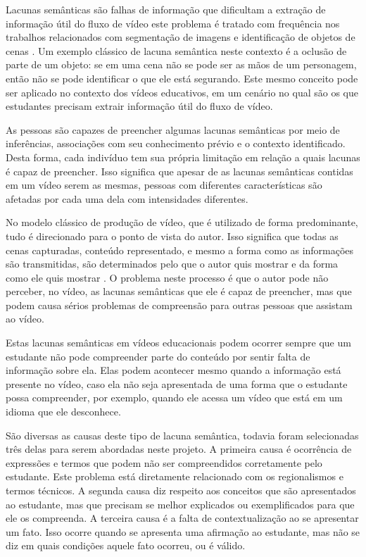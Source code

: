Lacunas semânticas são falhas de informação que dificultam a extração de informação útil do fluxo de vídeo este problema é tratado com frequência nos trabalhos relacionados com segmentação de imagens e identificação de objetos de cenas \cite{895972,SnoekICM2005}. Um exemplo clássico de lacuna semântica neste contexto é a oclusão de parte de um objeto: se em uma cena não se pode ser as mãos de um personagem, então não se pode identificar o que ele está segurando. Este mesmo conceito pode ser aplicado no contexto dos vídeos educativos, em um cenário no qual são os que estudantes precisam extrair informação útil do fluxo de vídeo.

As pessoas são capazes de preencher algumas lacunas semânticas por meio de inferências, associações com seu conhecimento prévio e o contexto identificado. Desta forma, cada indivíduo tem sua própria limitação em relação a quais lacunas é capaz de preencher. Isso significa que apesar de as lacunas semânticas contidas em um vídeo serem as mesmas, pessoas com diferentes características são afetadas por cada uma dela com intensidades diferentes.

No modelo clássico de produção de vídeo, que é utilizado de forma predominante, tudo é direcionado para o ponto de vista do autor. Isso significa que todas as cenas capturadas, conteúdo representado, e mesmo a forma como as informações são transmitidas, são determinados pelo que o autor quis mostrar e da forma como ele quis mostrar \cite{Bhimani:2013:VPE:2465958.2465976}. O problema neste processo é que o autor pode não perceber, no vídeo, as lacunas semânticas que ele é capaz de preencher, mas que podem causa sérios problemas de compreensão para outras pessoas que assistam ao vídeo. 

Estas lacunas semânticas em vídeos educacionais podem ocorrer sempre que um estudante não pode compreender parte do conteúdo por sentir falta de informação sobre ela. Elas podem acontecer mesmo quando a informação está presente no vídeo, caso ela não seja apresentada de uma forma que o estudante possa compreender, por exemplo, quando ele acessa um vídeo que está em um idioma que ele desconhece. 

São diversas as causas deste tipo de lacuna semântica, todavia foram selecionadas três delas para serem abordadas neste projeto. A primeira causa é ocorrência de expressões e termos que podem não ser compreendidos corretamente pelo estudante. Este problema está diretamente relacionado com os regionalismos e termos técnicos. A segunda causa diz respeito aos conceitos que são apresentados ao estudante, mas que precisam se melhor explicados ou exemplificados para que ele os compreenda. A terceira causa é a falta de contextualização ao se apresentar um fato. Isso ocorre quando se apresenta uma afirmação ao estudante, mas não se diz em quais condições aquele fato ocorreu, ou é válido.

